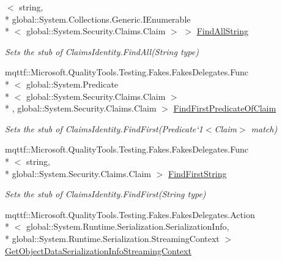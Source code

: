 \begin{DoxyCompactItemize}
$<$ string, \\*
global\-::\-System.\-Collections.\-Generic.\-I\-Enumerable\\*
$<$ global\-::\-System.\-Security.\-Claims.\-Claim $>$ $>$ \hyperlink{class_system_1_1_security_1_1_principal_1_1_fakes_1_1_stub_windows_identity_a9424ce4d8647f64054aa1a1e4945c9c9}{Find\-All\-String}
\begin{DoxyCompactList}\small\item\em Sets the stub of Claims\-Identity.\-Find\-All(\-String type)\end{DoxyCompactList}\item 
mqttf\-::\-Microsoft.\-Quality\-Tools.\-Testing.\-Fakes.\-Fakes\-Delegates.\-Func\\*
$<$ global\-::\-System.\-Predicate\\*
$<$ global\-::\-System.\-Security.\-Claims.\-Claim $>$\\*
, global\-::\-System.\-Security.\-Claims.\-Claim $>$ \hyperlink{class_system_1_1_security_1_1_principal_1_1_fakes_1_1_stub_windows_identity_a219a5eaf952d5b4d05655b74f351238b}{Find\-First\-Predicate\-Of\-Claim}
\begin{DoxyCompactList}\small\item\em Sets the stub of Claims\-Identity.\-Find\-First(Predicate`1$<$Claim$>$ match)\end{DoxyCompactList}\item 
mqttf\-::\-Microsoft.\-Quality\-Tools.\-Testing.\-Fakes.\-Fakes\-Delegates.\-Func\\*
$<$ string, \\*
global\-::\-System.\-Security.\-Claims.\-Claim $>$ \hyperlink{class_system_1_1_security_1_1_principal_1_1_fakes_1_1_stub_windows_identity_af2be028cf9216affbde2c2c48127c1f6}{Find\-First\-String}
\begin{DoxyCompactList}\small\item\em Sets the stub of Claims\-Identity.\-Find\-First(\-String type)\end{DoxyCompactList}\item 
mqttf\-::\-Microsoft.\-Quality\-Tools.\-Testing.\-Fakes.\-Fakes\-Delegates.\-Action\\*
$<$ global\-::\-System.\-Runtime.\-Serialization.\-Serialization\-Info, \\*
global\-::\-System.\-Runtime.\-Serialization.\-Streaming\-Context $>$ \hyperlink{class_system_1_1_security_1_1_principal_1_1_fakes_1_1_stub_windows_identity_a16b34b72ba51808f239eea54b1cdeb7f}{Get\-Object\-Data\-Serialization\-Info\-Streaming\-Context}

\end{DoxyCompactItemize}
